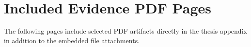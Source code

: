 \section{Included Evidence PDF Pages}

The following pages include selected PDF artifacts directly in the thesis appendix in addition to the embedded file attachments.












